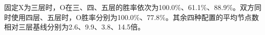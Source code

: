 固定X为三层时，O在三、四、五层的胜率依次为100.0\%、61.1\%、88.9\%。双方同时使用四层、五层时，O胜率分别为100.0\%、77.8\%。其余四种配置的平均节点数相对三层基线分别为2.6、9.9、3.8、14.5倍。
